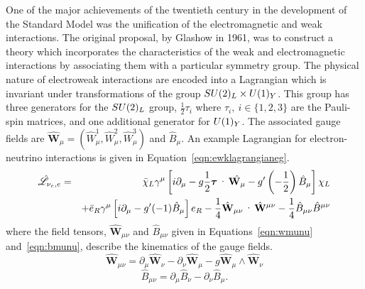 One of the major achievements of the twentieth century in 
the development of the Standard Model was the unification of the electromagnetic 
and weak interactions. The original proposal, by Glashow in 1961, was
to construct a theory which incorporates the characteristics of 
the weak and electromagnetic interactions by associating them 
with a particular symmetry group.
The physical nature of electroweak interactions are encoded into a Lagrangian which 
is invariant under transformations of the group $SU(2)_{L}\times U(1)_{Y}$. 
This group has three generators for the $SU(2)_{L}$ group, $\frac{1}{2}\tau_{i}$ 
where $\tau_{i},~i\in \{1,2,3 \}$ are the Pauli-spin matrices, and one
additional generator for $U(1)_{Y}$. The associated gauge fields are 
$\hat{\mathbf{W}}_{\mu} = \left(\hat{W}_{\mu}^{1},\hat{W}_{\mu}^{2},\hat{W}_{\mu}^{3}\right)$
 and $\hat{B}_{\mu}$.
An example Lagrangian for electron-neutrino interactions is 
given in Equation~\ref{eqn:ewklagrangianeg}.
\begin{eqnarray}
\lagr_{\nu_{e},e} & =& \bar{\chi}_{L}\gamma^{\mu}\left[i\partial_{\mu} 
		   - g\frac{1}{2}\boldsymbol{\tau}\cdot\hat{\mathbf{W}_{\mu}}
		   - g^{\prime}\left(-\frac{1}{2}\right)\hat{B}_{\mu}\right] \chi_{L}
\nonumber \\
& &		   + \bar{e}_{R}\gamma^{\mu}\left[i\partial_{\mu} 
		   - g^{\prime}(-1)\hat{B}_{\mu}\right]{e}_{R}
		     -\frac{1}{4}
		     \hat{\mathbf{W}}_{\mu\nu}\cdot\hat{\mathbf{W}}^{\mu\nu} 
		     -\frac{1}{4}
		     \hat{B}_{\mu\nu}\hat{B}^{\mu\nu}
\label{eqn:ewklagrangianeg}
\end{eqnarray}
where the field tensors, $\hat{\mathbf{W}}_{\mu\nu}$ and $\hat{B}_{\mu\nu}$ given in 
Equations~\ref{eqn:wmunu} and~\ref{eqn:bmunu},
describe the kinematics of the gauge fields.
\begin{equation}
\hat{\mathbf{W}}_{\mu\nu} = \partial_{\mu}\hat{\mathbf{W}}_{\nu} - \partial_{\nu}\hat{\mathbf{W}}_{\mu} - g \hat{\mathbf{W}}_{\mu}\wedge\hat{\mathbf{W}}_{\nu}
\label{eqn:wmunu}
\end{equation}
\begin{equation}
\hat{B}_{\mu\nu} = \partial_{\mu}\hat{B}_{\nu} - \partial_{\nu}\hat{B}_{\mu}.
\label{eqn:bmunu}
\end{equation}


